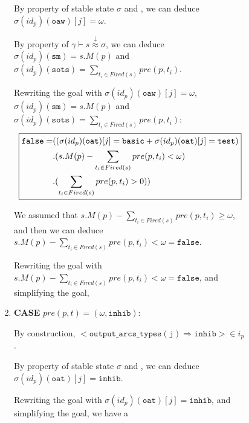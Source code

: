 \documentclass[dvipsnames,12pt]{article}
\begin{document}
\begin{niproof}
\begin{itemize}
\begin{itemize}
\begin{itemize}
\begin{enumerate}
\begin{enumerate}
            \noindent{}By property of stable state $\sigma$ and
            \InCsCompP, we can deduce $\sigma(id_p)(\texttt{oaw})[j]=\omega$.

            By property of
            $\gamma\vdash{}s\stackrel{\downarrow}{\approx}\sigma$, we
            can deduce $\sigma(id_p)(\texttt{sm})=s.M(p)$ and
            $\sigma(id_p)(\texttt{sots})=\sum\limits_{t_i\in{}Fired(s)}pre(p,t_i)$.

            Rewriting the goal with
            $\sigma(id_p)(\texttt{oaw})[j]=\omega$,
            $\sigma(id_p)(\texttt{sm})=s.M(p)$ and\\
            $\sigma(id_p)(\texttt{sots})=\sum\limits_{t_i\in{}Fired(s)}pre(p,t_i)$:
            \begin{equation*}
              \fbox{$\begin{split}
                  \mathtt{false}=& ((\sigma(id_p)(\texttt{oat})[j]=\mathtt{basic}+\sigma(id_p)(\texttt{oat})[j]=\mathtt{test}) \\
                  & .(s.M(p)-\sum\limits_{t_i\in{}Fired(s)}pre(p,t_i)<\omega)\\
                  & .(\sum\limits_{t_i\in{}Fired(s)}pre(p,t_i)>0))\\
                \end{split}$}
            \end{equation*}
            
            We assumed that
            $s.M(p)-\sum\limits_{t_i\in{}Fired(s)}pre(p,t_i)\ge\omega$,
            and then we can deduce
            $s.M(p)-\sum\limits_{t_i\in{}Fired(s)}pre(p,t_i)<\omega=\mathtt{false}$.
            

            Rewriting the goal with
            $s.M(p)-\sum\limits_{t_i\in{}Fired(s)}pre(p,t_i)<\omega=\mathtt{false}$,
            and simplifying the goal, 

          \item \textbf{CASE} $pre(p,t)=(\omega,\mathtt{inhib})$:
            
            By construction,
            ${<}\mathtt{output\_arcs\_types(j)\Rightarrow{}inhib}{>}\in{}i_p$.
            
            By property of stable state $\sigma$ and \InCsCompP, we
            can deduce $\sigma(id_p)(\texttt{oat})[j]=\mathtt{inhib}$.

            Rewriting the goal with
            $\sigma(id_p)(\texttt{oat})[j]=\mathtt{inhib}$, and simplifying
            the goal, we have a 
          \end{enumerate}
        \end{enumerate}
      \end{itemize}
    \end{itemize}
  \end{itemize}
\end{niproof}
\end{document}
